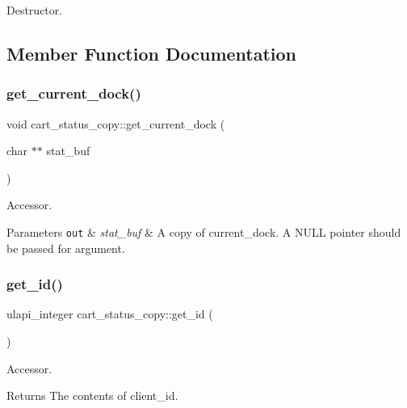 Destructor. 

\subsection{Member Function Documentation}
\mbox{\label{classcart__status__copy_abcd7994b919a1a5191df8d29fceacbb3}} 
\subsubsection{\texorpdfstring{get\+\_\+current\+\_\+dock()}{get\_current\_dock()}}
{\footnotesize\ttfamily void cart\+\_\+status\+\_\+copy\+::get\+\_\+current\+\_\+dock (\begin{DoxyParamCaption}\item[{char $\ast$$\ast$}]{stat\+\_\+buf }\end{DoxyParamCaption})}

Accessor. 
\begin{DoxyParams}[1]{Parameters}
\mbox{\tt out}  & {\em stat\+\_\+buf} & A copy of current\+\_\+dock. A N\+U\+LL pointer should be passed for argument. \\
\hline
\end{DoxyParams}
\mbox{\label{classcart__status__copy_a30bf6eef16e96b282b4e79ca9ccb36dd}} 
\subsubsection{\texorpdfstring{get\+\_\+id()}{get\_id()}}
{\footnotesize\ttfamily ulapi\+\_\+integer cart\+\_\+status\+\_\+copy\+::get\+\_\+id (\begin{DoxyParamCaption}{ }\end{DoxyParamCaption})}

Accessor. \begin{DoxyReturn}{Returns}
The contents of client\+\_\+id. 
\end{DoxyReturn}
\mbox{\label{classcart__status__copy_ae9b79c2205e6d9e2c64ac206cf551366}} 
